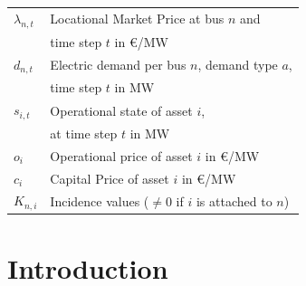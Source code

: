 \documentclass[11pt,twocolumn]{article}
\newcommand{\vpad}{\vspace{1mm}}
\newcommand{\state}{s_{i,t}}
\newcommand{\generation}{g_{s,t}}
\newcommand{\capacitygeneration}{G_{s}}
\newcommand{\flow}{f_{\ell,t}}
\newcommand{\capacityflow}{F_{\ell}}
\newcommand{\lmp}[1][n]{\lambda_{#1,t}}
\newcommand{\demand}[1][n]{d_{#1,t}}
\newcommand{\incidenceasset}[1][n]{K_{#1,i}}
\begin{document}
\begin{table}[h]
    \centering
    \begin{tabular}{ll}
        $\lmp$ & Locational Market Price at bus $n$ and  \\ & time step $t$ in \euro/MW \vpad \\
        $\demand$ & Electric demand per bus $n$, demand type $a$, \\ & time step $t$ in MW  \vpad \\
        $\state$ & Operational state of asset $i$, \\ & at time step $t$  in MW \vpad \\
        $o_i$ & Operational price of asset $i$ in \euro/MW \vpad \\
        $c_i$ & Capital Price of asset $i$ in \euro/MW \vpad \\
        $\incidenceasset$ & Incidence values ($\ne$0  if $i$ is attached to $n$)  \vpad 
    \end{tabular}
\end{table}

\section{Introduction}
\end{document}
